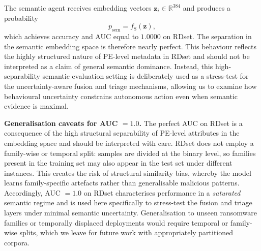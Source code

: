 \documentclass[lettersize,journal]{IEEEtran}
\begin{document}
The semantic agent receives embedding vectors \(\mathbf{z}_i \in \mathbb{R}^{384}\) and produces a probability
\begin{equation}
p_{\mathrm{sem}} = f_{\mathrm{S}}(\mathbf{z}),
\label{eq:psem}
\end{equation}
which achieves accuracy and AUC equal to \(1.0000\) on RDset. The separation in the semantic embedding space is therefore nearly perfect. This behaviour reflects the highly structured nature of PE-level metadata in RDset and should not be interpreted as a claim of general semantic dominance. Instead, this high-separability semantic evaluation setting is deliberately used as a stress-test for the uncertainty-aware fusion and triage mechanisms, allowing us to examine how behavioural uncertainty constrains autonomous action even when semantic evidence is maximal.

\noindent\textbf{Generalisation caveats for AUC $= 1.0$.}
The perfect AUC on RDset is a consequence of the high structural separability of PE-level
attributes in the embedding space and should be interpreted with care. RDset does not employ
a family-wise or temporal split: samples are divided at the binary level, so families present
in the training set may also appear in the test set under different instances. This creates
the risk of structural similarity bias, whereby the model learns family-specific artefacts
rather than generalisable malicious patterns. Accordingly, AUC $= 1.0$ on RDset characterises
performance in a \emph{saturated} semantic regime and is used here specifically to stress-test
the fusion and triage layers under minimal semantic uncertainty. Generalisation to unseen
ransomware families or temporally displaced deployments would require temporal or family-wise
splits, which we leave for future work with appropriately partitioned corpora.
\end{document}
